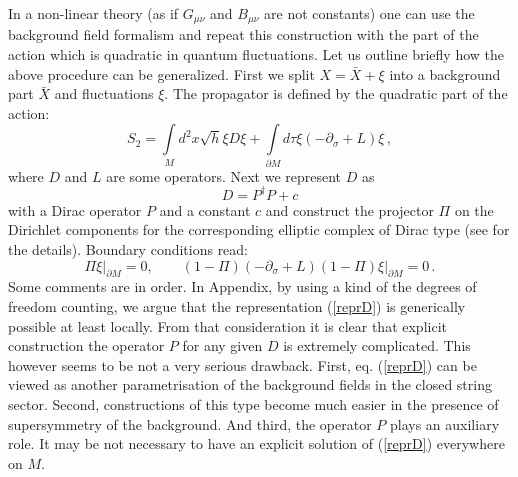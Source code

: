 \documentclass[a4paper,12pt,twoside]{article}
\begin{document}
In a non-linear theory (as if $G_{\mu\nu}$ and $B_{\mu\nu}$ are not constants)
one can use the background field formalism and repeat this
construction with the part of the action which is quadratic in
quantum fluctuations. Let us outline briefly how the above procedure
can be generalized. 
First we split $X=\bar X +\xi$ into a background
part $\bar X$ and fluctuations $\xi$. The propagator is defined by
the quadratic part of the action:
\begin{equation}
S_2=\int\limits_M d^2x\sqrt{h} \xi D \xi +\int\limits_{\partial M}
d\tau\xi(-\partial_\sigma +L)\xi \,,\label{backact}
\end{equation}
where $D$ and $L$ are some operators. Next we represent $D$ as
\begin{equation}
D=P^\dag P +c \label{reprD}
\end{equation}
with a Dirac operator $P$ and a constant $c$ and construct the
projector $\Pi$ on the Dirichlet components for the corresponding
elliptic complex of Dirac type (see \cite{Atiyah:1980jh,Grubb95,Dowker:2000sy}
for the details). Boundary conditions read:
\begin{equation}
\Pi \xi\vert_{\partial M}=0,\qquad 
(1-\Pi)(-\partial_\sigma +L)(1-\Pi)\xi\vert_{\partial M}=0\,.
\label{bcb}
\end{equation}
Some comments are in order. In Appendix, by using a kind of the degrees
of freedom counting, we argue
that the representation (\ref{reprD}) is generically
possible at least locally. From that consideration
it is clear that explicit construction the operator $P$ for any given $D$
is extremely complicated. This however seems to be not a very serious
drawback. First, eq. (\ref{reprD}) can be viewed as another parametrisation
of the background fields in the closed string sector. Second, constructions
of this type become much easier in the presence of supersymmetry of
the background. And third, the operator $P$ plays an auxiliary role.
It may be not necessary to have an explicit solution of (\ref{reprD})
everywhere on $M$.

\end{document}

